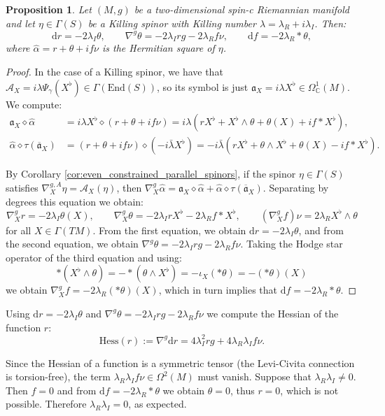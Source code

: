 \documentclass[10pt,a4paper,twoside,reqno]{amsart}
\theoremstyle{plain}
\newtheorem{prop}[thm]{Proposition}
\theoremstyle{definition}
\theoremstyle{remark}
\newcommand{\End}{\mathrm{End}}
\def\C{\mathbb{C}}
\def\dd{\mathrm{d}}
\def\fra{\mathfrak{a}}
\def\cA{\mathcal{A}}
\def\dd{\mathrm{d}}
\def\Hess{\mathrm{Hess}}
\begin{document}
\begin{prop}\label{prop:(2,0)_Killing}
    Let $(M,g)$ be a two-dimensional spin-c Riemannian manifold and let $\eta\in\Gamma(S)$ be a Killing spinor with Killing number $\lambda=\lambda_R+i\lambda_I$. Then: $$\dd r=-2\lambda_I\theta,\qquad \nabla^g\theta=-2\lambda_Irg-2\lambda_Rf\nu,\qquad \dd f=-2\lambda_R*\theta,$$ where $\widehat{\alpha}=r+\theta+if\nu$ is the Hermitian square of $\eta$.
\end{prop}

\begin{proof}
    In the case of a Killing spinor, we have that $\cA_X=i\lambda\Psi_\gamma(X^\flat)\in\Gamma(\End(S))$, so its symbol is just $\fra_X=i\lambda X^\flat\in\Omega^1_\C(M)$. We compute: \begin{align*}
        \fra_X\diamond\widehat{\alpha}&=i\lambda X^\flat\diamond(r+\theta+if\nu)=i\lambda(rX^\flat+X^\flat\wedge\theta+\theta(X)+if*X^\flat),\\
        \widehat{\alpha}\diamond\tau(\overline{\fra}_X)&=(r+\theta+if\nu)\diamond(-i\bar{\lambda}X^\flat)=-i\bar{\lambda}(rX^\flat+\theta\wedge X^\flat+\theta(X)-if*X^\flat).
    \end{align*}
    
    By Corollary \ref{cor:even_constrained_parallel_spinors}, if the spinor $\eta\in\Gamma(S)$ satisfies $\nabla^{g,A}_X\eta=\cA_X(\eta)$, then $\nabla^g_X\widehat{\alpha}=\fra_X\diamond\widehat{\alpha}+\widehat{\alpha}\diamond\tau(\overline{\fra}_X)$. Separating by degrees this equation we obtain: $$\nabla^g_Xr=-2\lambda_I\theta(X),\qquad \nabla^g_X\theta=-2\lambda_IrX^\flat-2\lambda_Rf*X^\flat,\qquad(\nabla^g_Xf)\nu=2\lambda_RX^\flat\wedge\theta$$ for all $X\in\Gamma(TM)$. From the first equation, we obtain $\dd r=-2\lambda_I\theta$, and from the second equation, we obtain $\nabla^g\theta=-2\lambda_Irg-2\lambda_Rf\nu$. Taking the Hodge star operator of the third equation and using: $$*(X^\flat\wedge\theta)=-*(\theta\wedge X^\flat)=-\iota_X(*\theta)=-(*\theta)(X)$$ we obtain $\nabla^g_Xf=-2\lambda_R(*\theta)(X)$, which in turn implies that $\dd f=-2\lambda_R*\theta$.
\end{proof}

Using $\dd r=-2\lambda_I\theta$ and $\nabla^g\theta=-2\lambda_Irg-2\lambda_Rf\nu$ we compute the Hessian of the function $r$: $$\Hess(r):=\nabla^g\dd r=4\lambda_I^2rg+4\lambda_R\lambda_If\nu.$$

Since the Hessian of a function is a symmetric tensor (the Levi-Civita connection is torsion-free), the term $\lambda_R\lambda_If\nu\in\Omega^2(M)$ must vanish. Suppose that $\lambda_R\lambda_I\neq0$. Then $f=0$ and from $\dd f=-2\lambda_R*\theta$ we obtain $\theta=0$, thus $r=0$, which is not possible. Therefore $\lambda_R\lambda_I=0$, as expected.
\end{document}
